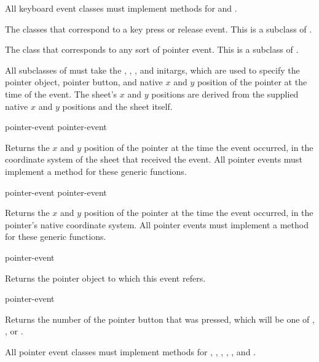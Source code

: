 All keyboard event classes must implement methods for
 and .

 
The classes that correspond to a key press or release event.  This is a subclass
of .


 
The class that corresponds to any sort of pointer event.  This is a subclass of
.

All subclasses of  must take the , ,
, and  initargs, which are used to specify the pointer object,
pointer button, and native $x$ and $y$ position of the pointer at the time of
the event.  The sheet's $x$ and $y$ positions are derived from the supplied
native $x$ and $y$ positions and the sheet itself.

 {pointer-event}
 {pointer-event}

Returns the $x$ and $y$ position of the pointer at the time the event occurred,
in the coordinate system of the sheet that received the event.  All pointer
events must implement a method for these generic functions.

 {pointer-event}
 {pointer-event}

Returns the $x$ and $y$ position of the pointer at the time the event occurred,
in the pointer's native coordinate system.  All pointer events must implement a
method for these generic functions.

 {pointer-event}

Returns the pointer object to which this event refers.

 {pointer-event}

Returns the number of the pointer button that was pressed, which will be
one of , , or
.

All pointer event classes must implement methods for ,
, , ,
, and .

